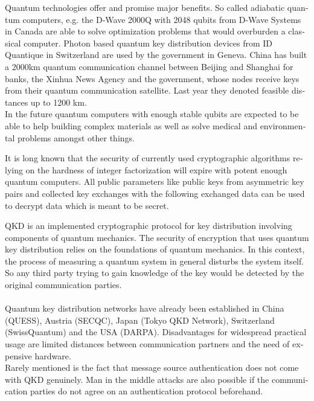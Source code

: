 \documentclass[a4paper,11pt]{article}
\begin{document}
\begin{otherlanguage}{english}
\begin{multicols}{2}
Quantum technologies offer and promise major benefits. So called adiabatic quantum computers, e.g. the D-Wave 2000Q with 2048 qubits from D-Wave Systems in Canada are able to solve optimization problems that would overburden a classical computer. Photon based quantum key distribution devices from ID Quantique in Switzerland are used by the government in Geneva. China has built a 2000km quantum communication channel between Beijing and Shanghai for banks, the Xinhua News Agency and the government, whose nodes receive keys from their quantum communication satellite. Last year they denoted feasible distances up to 1200 km. \\
In the future quantum computers with enough stable qubits are expected to be able to help building complex materials as well as solve medical and environmental problems amongst other things.

It is long known that the security of currently used cryptographic algorithms relying on the hardness of integer factorization will expire with potent enough quantum computers. All public parameters like public keys from asymmetric key pairs and collected key exchanges with the following exchanged data can be used to decrypt data which is meant to be secret. \\


QKD is an implemented cryptographic protocol for key distribution involving components of quantum mechanics. The security of encryption that uses quantum key distribution relies on the foundations of quantum mechanics. In this context, the process of measuring a quantum system in general disturbs the system itself. So any third party trying to gain knowledge of the key would be detected by the original communication parties. \\ 
\\
Quantum key distribution networks have already been established in China (QUESS), Austria (SECQC), Japan (Tokyo QKD Network), Switzerland (SwissQuantum) and the USA (DARPA). 
Disadvantages for widespread practical usage are limited distances between communication partners and the need of expensive hardware. \\
Rarely mentioned is the fact that message source authentication does not come with QKD genuinely. Man in the middle attacks are also possible if the communication parties do not agree on an authentication protocol beforehand.  


\end{multicols}
\end{otherlanguage}
\end{document}
